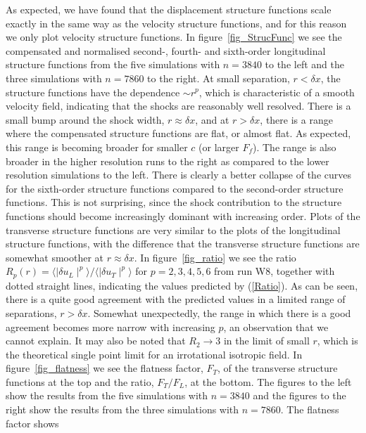 As expected, we have found that the displacement structure functions scale
exactly in the same way as the velocity structure functions, and for this reason we only plot
velocity structure functions. In figure~\ref{fig_StrucFunc} we see the
compensated and normalised second-, fourth- and sixth-order longitudinal
structure functions from the five simulations with $ n = 3840 $ to the left and
the three simulations with $ n = 7860 $ to the right. At small separation, $ r
< \delta x $, the structure functions have the dependence $ \sim r^{p} $, which
is characteristic of a smooth velocity field, indicating that the shocks are
reasonably well resolved. There is a small bump around the shock width, $ r
\approx \delta x $, and at $ r > \delta x $, there is a range where the
compensated structure functions are flat, or almost flat. As expected, this
range is becoming broader for smaller $ c $ (or larger $ F_f $). The range is
also broader in the higher resolution runs to the right as compared to the
lower resolution simulations to the left. There is clearly a better collapse of
the curves for the sixth-order structure functions compared to the second-order
structure functions. This is not surprising, since the shock contribution to
the structure functions should become increasingly dominant with increasing
order. Plots of the transverse structure functions are very similar to the
plots of the longitudinal structure functions, with the difference that the
transverse structure functions are somewhat smoother at $ r \approx \delta x $.
In figure~\ref{fig_ratio} we see the ratio $ R_{p}(r) = \langle \mid \delta
u_L \mid ^{p} \rangle / \langle \mid \delta u_T \mid ^{p} \rangle$ for $ p=
2,3,4,5,6 $ from run W8, together with dotted straight lines, indicating the
values predicted by (\ref{Ratio}). As can be seen, there is a quite good
agreement with the predicted values in a limited range of separations, $ r >
\delta x $. Somewhat unexpectedly, the range in which there is a good agreement
becomes more narrow with increasing $ p $, an observation that we cannot
explain. It may also be noted that $ R_2 \rightarrow 3 $ in the limit of small
$ r $, which is the theoretical single point limit for an irrotational
isotropic field. In figure~\ref{fig_flatness} we see the flatness factor, $
F_T $, of the transverse structure functions at the top and the ratio, $
F_T/F_L $, at the bottom. The figures to the left show the results from the
five simulations with $ n = 3840 $ and the figures to the right show the
results from the three simulations with $ n = 7860 $. The flatness factor shows
